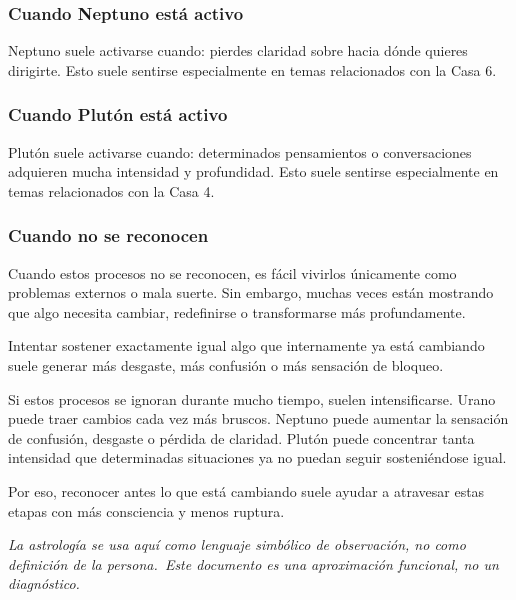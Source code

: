 \documentclass[11pt,a4paper]{article}
\begin{document}
\subsubsection*{Cuando Neptuno está activo}
Neptuno suele activarse cuando: pierdes claridad sobre hacia dónde quieres dirigirte. Esto suele sentirse especialmente en temas relacionados con la Casa 6.

\subsubsection*{Cuando Plutón está activo}
Plutón suele activarse cuando: determinados pensamientos o conversaciones adquieren mucha intensidad y profundidad. Esto suele sentirse especialmente en temas relacionados con la Casa 4.

\subsubsection*{Cuando no se reconocen}
Cuando estos procesos no se reconocen, es fácil vivirlos únicamente como problemas externos o mala suerte. Sin embargo, muchas veces están mostrando que algo necesita cambiar, redefinirse o transformarse más profundamente.

Intentar sostener exactamente igual algo que internamente ya está cambiando suele generar más desgaste, más confusión o más sensación de bloqueo.

\vspace{0.6cm}
Si estos procesos se ignoran durante mucho tiempo, suelen intensificarse. Urano puede traer cambios cada vez más bruscos. Neptuno puede aumentar la sensación de confusión, desgaste o pérdida de claridad. Plutón puede concentrar tanta intensidad que determinadas situaciones ya no puedan seguir sosteniéndose igual.

Por eso, reconocer antes lo que está cambiando suele ayudar a atravesar estas etapas con más consciencia y menos ruptura.

\vspace{1cm}
\begin{center}
{\small\itshape\color{grisai}
La astrología se usa aquí como lenguaje simbólico de observación, no como definición de la persona.\
Este documento es una aproximación funcional, no un diagnóstico.
}
\end{center}
\end{document}
